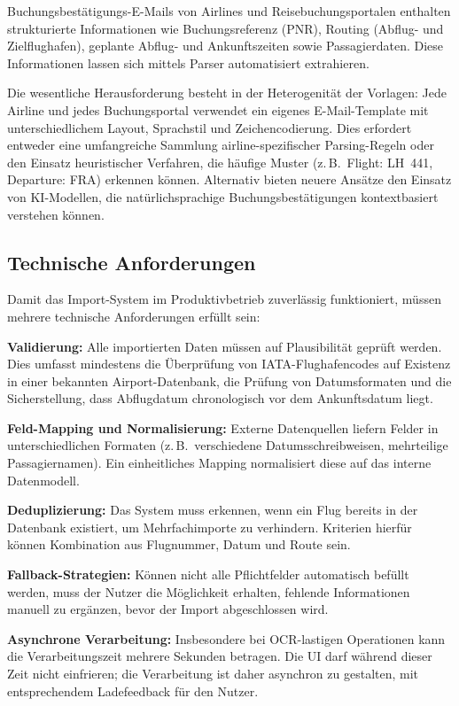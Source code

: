 Buchungsbestätigungs-E-Mails von Airlines und Reisebuchungsportalen enthalten strukturierte Informationen wie Buchungsreferenz (PNR), Routing (Abflug- und Zielflughafen), geplante Abflug- und Ankunftszeiten sowie Passagierdaten.
Diese Informationen lassen sich mittels Parser automatisiert extrahieren.

Die wesentliche Herausforderung besteht in der Heterogenität der Vorlagen: Jede Airline und jedes Buchungsportal verwendet ein eigenes E-Mail-Template mit unterschiedlichem Layout, Sprachstil und Zeichencodierung.
Dies erfordert entweder eine umfangreiche Sammlung airline-spezifischer Parsing-Regeln oder den Einsatz heuristischer Verfahren, die häufige Muster (z.\,B.\ \glqq Flight: LH~441\grqq{}, \glqq Departure: FRA\grqq{}) erkennen können.
Alternativ bieten neuere Ansätze den Einsatz von KI-Modellen, die natürlichsprachige Buchungsbestätigungen kontextbasiert verstehen können.

\subsection{Technische Anforderungen}

Damit das Import-System im Produktivbetrieb zuverlässig funktioniert, müssen mehrere technische Anforderungen erfüllt sein:

\textbf{Validierung:} Alle importierten Daten müssen auf Plausibilität geprüft werden.
Dies umfasst mindestens die Überprüfung von IATA-Flughafencodes auf Existenz in einer bekannten Airport-Datenbank, die Prüfung von Datumsformaten und die Sicherstellung, dass Abflugdatum chronologisch vor dem Ankunftsdatum liegt.

\textbf{Feld-Mapping und Normalisierung:} Externe Datenquellen liefern Felder in unterschiedlichen Formaten (z.\,B.\ verschiedene Datumsschreibweisen, mehrteilige Passagiernamen).
Ein einheitliches Mapping normalisiert diese auf das interne Datenmodell.

\textbf{Deduplizierung:} Das System muss erkennen, wenn ein Flug bereits in der Datenbank existiert, um Mehrfachimporte zu verhindern.
Kriterien hierfür können Kombination aus Flugnummer, Datum und Route sein.

\textbf{Fallback-Strategien:} Können nicht alle Pflichtfelder automatisch befüllt werden, muss der Nutzer die Möglichkeit erhalten, fehlende Informationen manuell zu ergänzen, bevor der Import abgeschlossen wird.

\textbf{Asynchrone Verarbeitung:} Insbesondere bei OCR-lastigen Operationen kann die Verarbeitungszeit mehrere Sekunden betragen.
Die UI darf während dieser Zeit nicht einfrieren; die Verarbeitung ist daher asynchron zu gestalten, mit entsprechendem Ladefeedback für den Nutzer.

